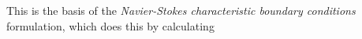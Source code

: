 This is the basis of the \emph{Navier-Stokes characteristic boundary conditions} formulation, which does this by calculating 












